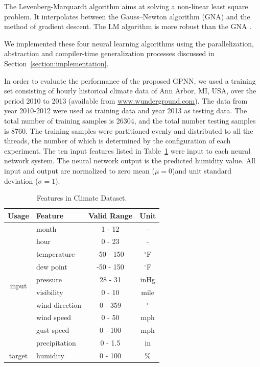 \documentclass[procedia]{easychair}
\begin{document}
The Levenberg-Marquardt algorithm aims at solving a non-linear least square problem.  It interpolates between the Gauss–Newton algorithm (GNA) and the method of gradient descent. The LM algorithm is more robust than the GNA \cite{hagan1994training}.

We implemented these four neural learning algorithms using the parallelization, abstraction and compiler-time generalization processes discussed in Section~\ref{section:implementation}.

In order to evaluate the performance of the proposed GPNN, we used a training set consisting of hourly historical climate data of Ann Arbor, MI, USA, over the period 2010 to 2013 (available from \url{www.wunderground.com}).  The data from year 2010-2012 were used as training data and year 2013 as testing data.  The total number of training samples is 26304, and the total number testing samples is 8760.  The training samples were partitioned evenly and distributed to all the threads, the number of which is determined by the configuration of each experiment.  The ten input features listed in Table~\ref{table:climate} were input to each neural network system.  The neural network output is the predicted humidity value.  All input and output are normalized to zero mean ($ \mu = 0 $)and unit standard deviation ($ \sigma = 1 $).

\begin{table}[htp]
    \centering
    \caption{Features in Climate Dataset.}
    \begin{tabular}{ c l c c }
        \hline \hline
        Usage & Feature & Valid Range & Unit \\
        \hline
        \multirow{10}{*}{input}
            & month & 1 - 12 & - \\
            & hour & 0 - 23 & - \\
            & temperature & -50 - 150 & \(^\circ\)F \\
            & dew point & -50 - 150 & \(^\circ\)F \\
            & pressure & 28 - 31 & inHg \\
            & visibility & 0 - 10 & mile \\
            & wind direction & 0 - 359 & \(^\circ\) \\
            & wind speed & 0 - 50 & mph \\
            & gust speed & 0 - 100 & mph \\
            & precipitation & 0 - 1.5 & in \\
        \hline
        target & humidity & 0 - 100 & \% \\
        \hline \hline
    \end{tabular}
    \label{table:climate}
\end{table}
\end{document}
